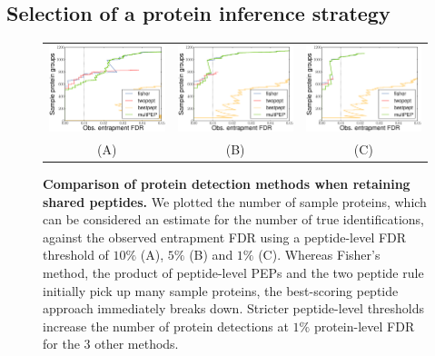 \documentclass{article}
\begin{document}
\subsection*{Selection of a protein inference strategy}

\begin{figure}
\begin{center}
\begin{tabular}{ccc} 
\includegraphics[width=0.3\linewidth]
  {./img/shared-pept-performance-fdr10} &
\includegraphics[width=0.3\linewidth]
  {./img/shared-pept-performance-fdr5} &
\includegraphics[width=0.3\linewidth]
  {./img/shared-pept-performance-fdr1}\\
(A) & (B) & (C)
\end{tabular}
\caption{\label{fig:shared-performance}\textbf{Comparison of protein
    detection methods when retaining shared peptides.} We plotted the
  number of sample proteins, which can be considered an estimate for
  the number of true identifications, against the observed entrapment
  FDR using a peptide-level FDR threshold of $10\%$ (A), $5\%$ (B) and
  $1\%$ (C). Whereas Fisher's method, the product of peptide-level
  PEPs and the two peptide rule initially pick up many sample
  proteins, the best-scoring peptide approach immediately breaks
  down. Stricter peptide-level thresholds increase the number of
  protein detections at $1\%$ protein-level FDR for the $3$ other
  methods.}
\end{center}
\end{figure}
\end{document}
